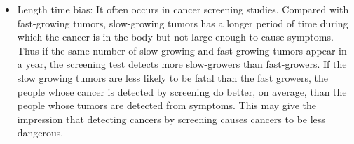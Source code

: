 \begin{itemize}
\item Length time bias: It often occurs in cancer screening studies. Compared with fast-growing tumors, slow-growing tumors has a longer period of time during which the cancer is in the body but not large enough to cause symptoms. Thus if the same number of slow-growing and fast-growing tumors appear in a year, the screening test detects more slow-growers than fast-growers. If the slow growing tumors are less likely to be fatal than the fast growers, the people whose cancer is detected by screening do better, on average, than the people whose tumors are detected from symptoms. This may give the impression that detecting cancers by screening causes cancers to be less dangerous.  %

\end{itemize}

